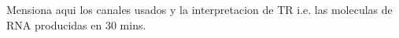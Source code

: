 
\glsresetall
\graphicspath{{./Sections/Methodology/Resources/}}

Mensiona aqui los canales usados y la interpretacion de TR i.e. las moleculas de RNA producidas en 30 mins.
